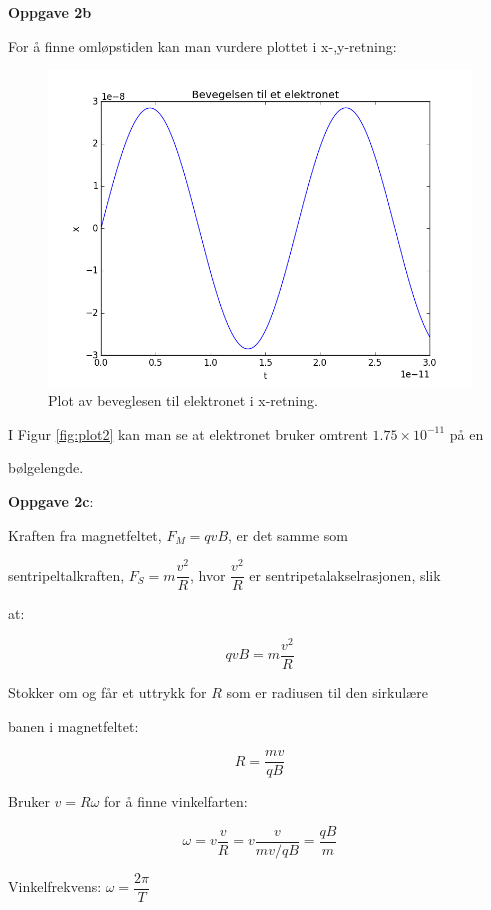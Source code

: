 \documentclass[a4paper,norsk,12pt]{article}
\begin{document}
\textbf{Oppgave 2b}

For å finne omløpstiden kan man vurdere plottet i x-,y-retning:

\begin{figure}[H]
  \includegraphics[width=\linewidth]{oppgave24.png}
  \caption{Plot av beveglesen til elektronet i x-retning.}
  \label{fig:plot4}
\end{figure}

I Figur \ref{fig:plot2} kan man se at elektronet bruker omtrent $ 1.75 \times 10^{-11}$ på en 

bølgelengde. 

\hspace{1cm}

\textbf{Oppgave 2c}:

Kraften fra magnetfeltet, $F_M = q v B$, er det samme som 

sentripeltalkraften, $F_S = m \dfrac{v^2}{R}$, hvor $\dfrac{v^2}{R}$ er sentripetalakselrasjonen, slik 

at:

$$ q v B = m \dfrac{v^2}{R} $$ 

Stokker om og får et uttrykk for $R$ som er radiusen til den sirkulære 

banen i magnetfeltet:

$$ R = \dfrac{m v}{q B} $$ 

Bruker $ v = R \omega $ for å finne vinkelfarten:

$$ \omega = v \dfrac{v}{R} = v \dfrac{v}{{m v}/{q B}} =\dfrac{q B}{m} $$

Vinkelfrekvens: $\omega = \dfrac{2 \pi}{T}$
\end{document}
